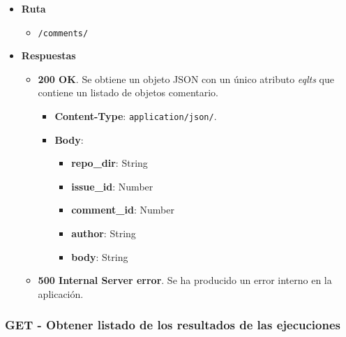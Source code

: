 \begin{itemize}
    \item[] \textbf{Ruta}
        \begin{itemize} \setlength\itemsep{0.2em}
            \item[] \texttt{/comments/}
        \end{itemize}
    \item[] \textbf{Respuestas}
        \begin{itemize} \setlength\itemsep{0.2em}
            \item[] \textbf{200 OK}. Se obtiene un objeto JSON con un único atributo \textit{eqlts} que contiene un listado de objetos comentario.
                \begin{itemize} \setlength\itemsep{0.2em}
                    \item[] \textbf{Content-Type}: \texttt{application/json/}.
                    \item[] \textbf{Body}: 
                        \begin{itemize} \setlength\itemsep{0.2em}
                            \item[] \textbf{repo\_dir}: String
                            \item[] \textbf{issue\_id}: Number
                            \item[] \textbf{comment\_id}: Number
                            \item[] \textbf{author}: String
                            \item[] \textbf{body}: String
                        \end{itemize}
                \end{itemize}
            \item[] \textbf{500 Internal Server error}. Se ha producido un error interno en la aplicación.
        \end{itemize}
\end{itemize}

\subsubsection{GET - Obtener listado de los resultados de las ejecuciones}

